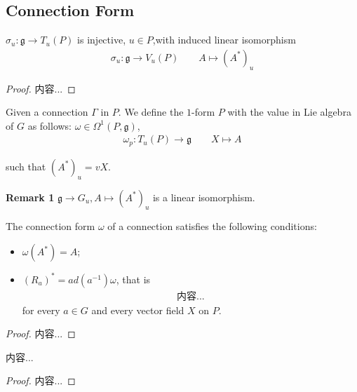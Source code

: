 \documentclass[Total.tex]{subfiles}
\begin{document}
			\subsection{Connection Form}
			
			\begin{lemma}
				$\sigma_u:\mathfrak{g}\rightarrow T_u(P)$ is injective, $u\in P$,with induced linear isomorphism
				\begin{gather*}
					\sigma_u:\mathfrak{g}\rightarrow V_u(P)\qquad A\mapsto (A^*)_u
				\end{gather*}
			\end{lemma}
			\begin{proof}
				内容...
			\end{proof}
			
			\begin{Def}
				Given a connection $\Gamma$ in $P$. We define the $1$-form $P$ with the value in Lie algebra of $G$ as follows: $\omega\in \Omega^1(P,\mathfrak{g})$,
				\begin{gather*}
					\omega_p:T_u(P)\rightarrow \mathfrak{g}\qquad X\mapsto A
				\end{gather*}
				
				such that $(A^*)_u=vX$.
			\end{Def}
			
			\textbf{Remark 1} $\mathfrak{g}\rightarrow G_u,A\mapsto (A^*)_u$ is a linear isomorphism.
			
			\begin{proposition}
				The connection form $\omega$ of a connection satisfies the following conditions:
				\begin{itemize}
					\item $\omega(A^*)=A$;
					\item $(R_a)^*=ad(a^{-1})\omega$, that is
					\begin{gather*}
						内容...
					\end{gather*}
					for every $a\in G$ and every vector field $X$ on $P$. 
				\end{itemize}
			\end{proposition}
			\begin{proof}
				内容...
			\end{proof}
			
			\begin{proposition}
				内容...
			\end{proposition}
			\begin{proof}
				内容...
			\end{proof}
			
\end{document}
